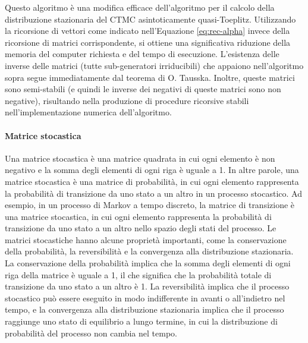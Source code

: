 \documentclass[11pt]{article}
\newtheorem{corollario}[teorema]{Corollario}
\begin{document}
Questo algoritmo è una modifica efficace dell'algoritmo per il calcolo della distribuzione stazionaria del CTMC asintoticamente quasi-Toeplitz. Utilizzando la ricorsione di vettori come indicato nell'Equazione \ref{eq:rec-alpha} invece della ricorsione di matrici corrispondente, si ottiene una significativa riduzione della memoria del computer richiesta e del tempo di esecuzione. L'esistenza delle inverse delle matrici (tutte sub-generatori irriducibili) che appaiono nell'algoritmo sopra segue immediatamente dal teorema di O. Tausska. Inoltre, queste matrici sono semi-stabili (e quindi le inverse dei negativi di queste matrici sono non negative), risultando nella produzione di procedure ricorsive stabili nell'implementazione numerica dell'algoritmo.

\paragraph{Matrice stocastica} Una matrice stocastica è una matrice quadrata in cui ogni elemento è non negativo e la somma degli elementi di ogni riga è uguale a 1. In altre parole, una matrice stocastica è una matrice di probabilità, in cui ogni elemento rappresenta la probabilità di transizione da uno stato a un altro in un processo stocastico. Ad esempio, in un processo di Markov a tempo discreto, la matrice di transizione è una matrice stocastica, in cui ogni elemento rappresenta la probabilità di transizione da uno stato a un altro nello spazio degli stati del processo. Le matrici stocastiche hanno alcune proprietà importanti, come la conservazione della probabilità, la reversibilità e la convergenza alla distribuzione stazionaria. La conservazione della probabilità implica che la somma degli elementi di ogni riga della matrice è uguale a 1, il che significa che la probabilità totale di transizione da uno stato a un altro è 1. La reversibilità implica che il processo stocastico può essere eseguito in modo indifferente in avanti o all'indietro nel tempo, e la convergenza alla distribuzione stazionaria implica che il processo raggiunge uno stato di equilibrio a lungo termine, in cui la distribuzione di probabilità del processo non cambia nel tempo.

\end{document}
